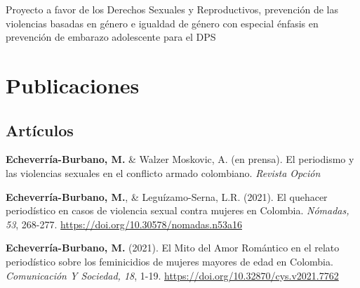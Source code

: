 \documentclass[11pt,a4paper,]{awesome-cv}
\begin{document}
\begin{cventries}
{\begin{cvitems}
\item Proyecto a favor de los Derechos Sexuales y Reproductivos, prevención de las violencias basadas en género e igualdad de género con especial énfasis en prevención de embarazo adolescente para el DPS
\end{cvitems}}
\end{cventries}

\hypertarget{publicaciones}{%
\section{Publicaciones}\label{publicaciones}}

\hypertarget{section}{%
\subsection{\texorpdfstring{\textbf{Artículos}}{}}\label{section}}

\begingroup
\setlength{\parindent}{-0.5in}
\setlength{\leftskip}{0.5in}

\textbf{Echeverría-Burbano, M.} \& Walzer Moskovic, A. (en prensa). El
periodismo y las violencias sexuales en el conflicto armado colombiano.
\emph{Revista Opción}

\textbf{Echeverría-Burbano, M.}, \& Leguízamo-Serna, L.R. (2021). El
quehacer periodístico en casos de violencia sexual contra mujeres en
Colombia. \emph{Nómadas, 53}, 268-277.
\url{https://doi.org/10.30578/nomadas.n53a16}

\textbf{Echeverría-Burbano, M.} (2021). El Mito del Amor Romántico en el
relato periodístico sobre los feminicidios de mujeres mayores de edad en
Colombia. \emph{Comunicación Y Sociedad, 18}, 1-19.
\url{https://doi.org/10.32870/cys.v2021.7762}
\end{document}
